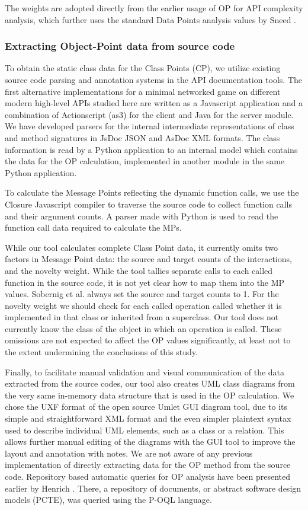 \documentclass[conference]{IEEEtran}
\begin{document}
The weights are adopted directly from the earlier usage of OP for API
complexity analysis, which further uses the standard Data Points
analysis values by Sneed \cite{Sneed}.

\subsubsection{Extracting Object-Point data from source code}

To obtain the static class data for the Class Points (CP), we utilize
existing source code parsing and annotation systems in the API
documentation tools. The first alternative implementations for a
minimal networked game on different modern high-level APIs studied
here are written as a Javascript application and a combination of
Actionscript (as3) for the client and Java for the server module. We
have developed parsers for the internal intermediate representations
of class and method signatures in JsDoc JSON and AsDoc XML
formats. The class information is read by a Python application to an
internal model which contains the data for the OP calculation,
implemented in another module in the same Python application.

To calculate the Message Points reflecting the dynamic function calls,
we use the Closure Javascript compiler to traverse the source code to
collect function calls and their argument counts. A parser made with
Python is used to read the function call data required to calculate
the MPs.

While our tool calculates complete Class Point data, it currently
omits two factors in Message Point data: the source and target counts
of the interactions, and the novelty weight. While the tool tallies
separate calls to each called function in the source code, it is not
yet clear how to map them into the MP values. Sobernig et al. always
set the source and target counts to 1. For the novelty weight we
should check for each called operation called whether it is
implemented in that class or inherited from a superclass. Our tool
does not currently know the class of the object in which an operation
is called. These omissions are not expected to affect the OP values
significantly, at least not to the extent undermining the conclusions
of this study.  

Finally, to facilitate manual validation and visual communication of
the data extracted from the source codes, our tool also creates UML
class diagrams from the very same in-memory data structure that is
used in the OP calculation. We chose the UXF format of the open source
Umlet GUI diagram tool, due to its simple and straightforward XML
format and the even simpler plaintext syntax used to describe
individual UML elements, such as a class or a relation. This allows
further manual editing of the diagrams with the GUI tool to improve
the layout and annotation with notes. We are not aware of any previous
implementation of directly extracting data for the OP method from the
source code. Repository based automatic queries for OP analysis have
been presented earlier by Henrich
\cite{henrich97repositorybased}. There, a repository of documents, or
abstract software design models (PCTE), was queried using the P-OQL
language.
\end{document}
